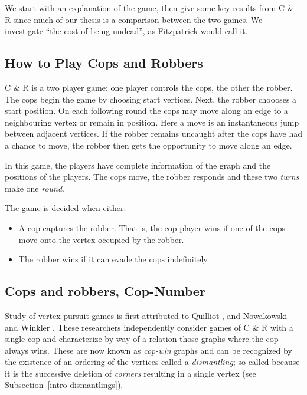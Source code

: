 We start with an explanation of the game, then give some key results from C \& R since much of our thesis is a comparison between the two games. We investigate ``the cost of being undead'', as Fitzpatrick \cite{fitzpatrick2016deterministic} would call it.

\subsection{How to Play Cops and Robbers}

C \& R is a two player game: one player controls the cops, the other the robber.
The cops begin the game by choosing start vertices. Next, the robber choooses a start position.
On each following round the cops may move along an edge to a neighbouring vertex
or remain in position.
Here a move is an instantaneous jump between adjacent vertices.
If the robber remains uncaught after the cops have had a chance to move, the
robber then gets the opportunity to move along an edge.

In this game, the players have complete information of the graph and the positions of the players.
The cops move, the robber responds and these two \textit{turns} make one \textit{round}.

The game is decided when either:
\begin{itemize}
\item A cop captures the robber. That is, the cop player wins if one of the cops move onto the vertex
occupied by the robber.
\item The robber wins if it can evade the cops indefinitely.
\end{itemize}

\subsection{Cops and robbers, Cop-Number}

Study of vertex-pursuit games is first attributed to Quilliot \cite{quilliot1978jeux, quilliot1983problemes}, and Nowakowski and Winkler \cite{nowakowski1983vertex}.
These researchers independently consider games of C \& R with a single cop and characterize by way of a relation those graphs where the cop always wins. These are now known as \textit{cop-win} graphs
and can be recognized by the existence of an ordering of the vertices called a \textit{dismantling};
so-called because it is the successive deletion of \textit{corners} resulting in a single vertex (see Subsection~\ref{intro dismantlings}).

